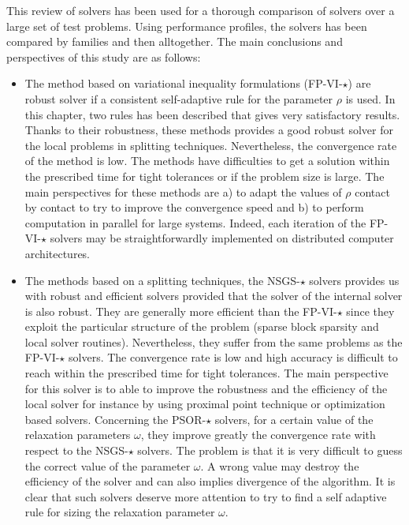 This review of solvers has been used for a thorough comparison of solvers over a large set of test problems. Using performance profiles, the solvers has been compared by families and then alltogether. The main conclusions and perspectives of this study are as follows:
\begin{itemize}
\item The method based on variational inequality formulations ({\sf FP-VI-$\star$}) are robust solver if a consistent self-adaptive rule for the parameter $\rho$ is used. In this chapter, two rules has been described that gives very satisfactory results. Thanks to their robustness, these methods provides a good robust solver for the local problems in splitting techniques. Nevertheless, the convergence rate of the method is low. The methods have difficulties to get a solution within the prescribed time for tight tolerances or if the problem size is large. The main perspectives for these methods are a) to adapt the values of $\rho$ contact by contact to try to improve the convergence speed and b) to perform computation in parallel for large systems. Indeed, each iteration of the {\sf FP-VI-$\star$} solvers may be straightforwardly implemented on distributed computer architectures.

\item The methods based on a splitting techniques, the {\sf NSGS-$\star$} solvers provides us with robust and efficient solvers provided that the solver of the internal solver is also robust. They are generally more efficient than the {\sf FP-VI-$\star$} since they exploit the particular structure of the problem (sparse block sparsity and local solver routines). Nevertheless, they suffer from the same problems as the  {\sf FP-VI-$\star$} solvers. The convergence rate is low and high accuracy is difficult to reach within the prescribed time for tight tolerances. The main perspective for this solver is to able to improve the robustness and the efficiency of the local solver for instance by using proximal point technique or optimization based solvers. Concerning the {\sf PSOR-$\star$} solvers, for a certain value of the relaxation parameters $\omega$, they improve greatly the convergence rate with respect to the {\sf NSGS-$\star$} solvers. The problem is that it is very difficult to guess the correct value of the parameter $\omega$. A wrong value may destroy the efficiency of the solver and can also implies divergence of the algorithm. It is clear that such solvers deserve more attention to try to find a self adaptive rule for sizing the relaxation parameter $\omega$.


\end{itemize}
